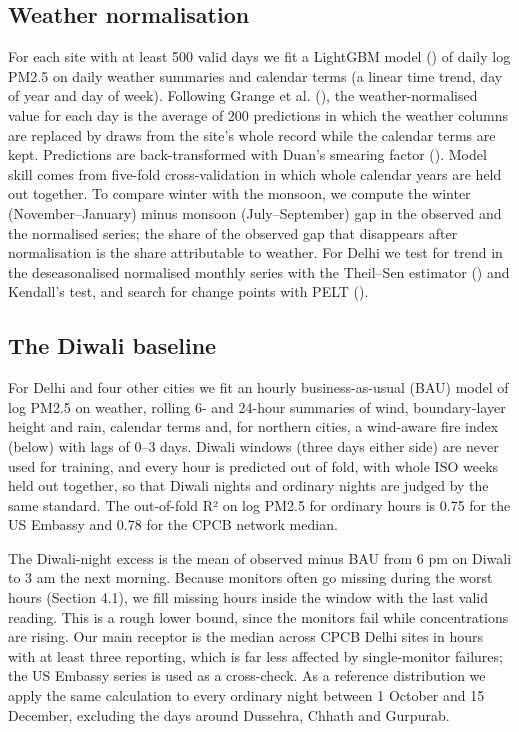 \documentclass[
  11pt,
]{article}
\begin{document}
\subsection{Weather normalisation}\label{weather-normalisation}

For each site with at least 500 valid days we fit a LightGBM model
() of daily log PM2.5 on daily
weather summaries and calendar terms (a linear time trend, day of year
and day of week). Following Grange et al.
(), the weather-normalised value for each
day is the average of 200 predictions in which the weather columns are
replaced by draws from the site's whole record while the calendar terms
are kept. Predictions are back-transformed with Duan's smearing factor
(). Model skill comes from five-fold
cross-validation in which whole calendar years are held out together. To
compare winter with the monsoon, we compute the winter
(November--January) minus monsoon (July--September) gap in the observed
and the normalised series; the share of the observed gap that disappears
after normalisation is the share attributable to weather. For Delhi we
test for trend in the deseasonalised normalised monthly series with the
Theil--Sen estimator () and Kendall's
test, and search for change points with PELT
().

\subsection{The Diwali baseline}\label{the-diwali-baseline}

For Delhi and four other cities we fit an hourly business-as-usual (BAU)
model of log PM2.5 on weather, rolling 6- and 24-hour summaries of wind,
boundary-layer height and rain, calendar terms and, for northern cities,
a wind-aware fire index (below) with lags of 0--3 days. Diwali windows
(three days either side) are never used for training, and every hour is
predicted out of fold, with whole ISO weeks held out together, so that
Diwali nights and ordinary nights are judged by the same standard. The
out-of-fold R² on log PM2.5 for ordinary hours is 0.75 for the US
Embassy and 0.78 for the CPCB network median.

The Diwali-night excess is the mean of observed minus BAU from 6 pm on
Diwali to 3 am the next morning. Because monitors often go missing
during the worst hours (Section 4.1), we fill missing hours inside the
window with the last valid reading. This is a rough lower bound, since
the monitors fail while concentrations are rising. Our main receptor is
the median across CPCB Delhi sites in hours with at least three
reporting, which is far less affected by single-monitor failures; the US
Embassy series is used as a cross-check. As a reference distribution we
apply the same calculation to every ordinary night between 1 October and
15 December, excluding the days around Dussehra, Chhath and Gurpurab.
\end{document}

